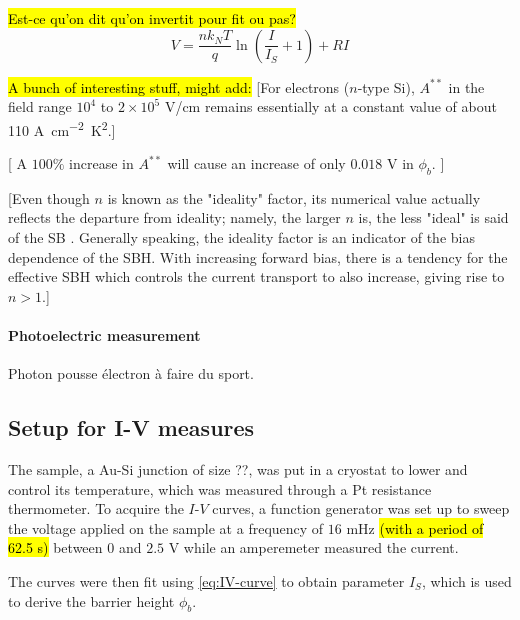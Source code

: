 \hl{Est-ce qu'on dit qu'on invertit pour fit ou pas?}
\begin{equation} \label{eq:IV-curve}
    V = \frac{n k_N T}{q} \ln \left( \frac{I}{I_S} +1 \right) + RI
\end{equation}

\hl{A bunch of interesting stuff, might add:}
[For electrons ($n$-type Si), $A^{**}$ in the field range $10^4$ to $2\times 10^5$ V/cm remains essentially at a constant value of about 110 \unit{A cm^{-2} K^2}.]

[ A $100 \%$ increase in $A^{**}$ will cause an increase of only $0.018$ V in $\phi_b$. ]


[Even though $n$ is known as the  "ideality" factor, its numerical value actually reflects the departure from ideality; namely, the larger $n$ is, the less "ideal" is said of the SB \cite{tung_recent_2001}.
Generally speaking, the ideality factor is an indicator of the bias dependence of the SBH. With increasing forward bias, there is a tendency for the effective SBH which controls the current transport to also increase, giving rise to $n > 1$.]


\paragraph{Photoelectric measurement}
Photon pousse électron à faire du sport.

\subsection{Setup for I-V measures}
The sample, a Au-Si junction of size ??, was put in a cryostat to lower and control its temperature, which was measured through a Pt resistance thermometer.
To acquire the $I$-$V$ curves, a function generator was set up to sweep the voltage applied on the sample at a frequency of $16$ mHz \hl{(with a period of 62.5 s)} between $0$ and $2.5$ V while an amperemeter measured the current. 

The curves were then fit using \autoref{eq:IV-curve} to obtain parameter $I_S$, which is used to derive the barrier height $\phi_b$.
